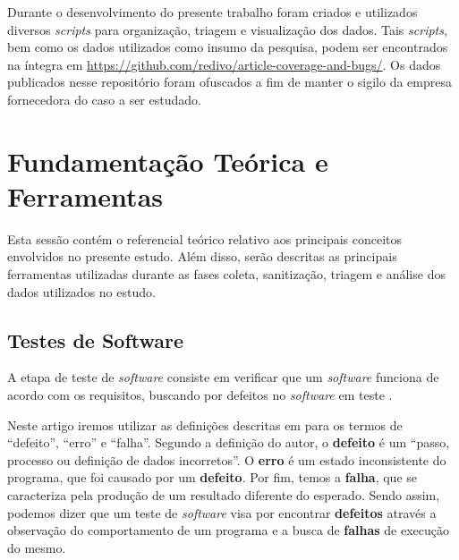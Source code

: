 \documentclass[11.5pt]{article}
\begin{document}
Durante o desenvolvimento do presente trabalho foram criados e utilizados diversos \textit{scripts}
para organização, triagem e visualização dos dados.
Tais \textit{scripts}, bem como os dados utilizados como insumo da pesquisa, podem ser encontrados
na íntegra em \url{https://github.com/redivo/article-coverage-and-bugs/}.
Os dados publicados nesse repositório foram ofuscados a fim de manter o sigilo da empresa
fornecedora do caso a ser estudado.




\section{Fundamentação Teórica e Ferramentas}

Esta sessão contém o referencial teórico relativo aos principais conceitos envolvidos no presente
estudo.
Além disso, serão descritas as principais ferramentas utilizadas durante as fases coleta,
sanitização, triagem e análise dos dados utilizados no estudo.


\subsection{Testes de Software}

A etapa de teste de \textit{software} consiste em verificar que um \textit{software} funciona de
acordo com os requisitos, buscando por defeitos no \textit{software} em teste
\cite{engSwSommerville}.

Neste artigo iremos utilizar as definições descritas em \cite{introTeste} para os termos de
``defeito'', ``erro'' e ``falha''.
Segundo a definição do autor, o \textbf{defeito} é um ``passo, processo ou definição de dados
incorretos''. O \textbf{erro} é um estado inconsistente do programa, que foi causado por um
\textbf{defeito}.
Por fim, temos a \textbf{falha}, que se caracteriza pela produção de um resultado diferente do
esperado.
Sendo assim, podemos dizer que um teste de \textit{software} visa por encontrar \textbf{defeitos}
através a observação do comportamento de um programa e a busca de \textbf{falhas} de execução
do mesmo.
\end{document}
